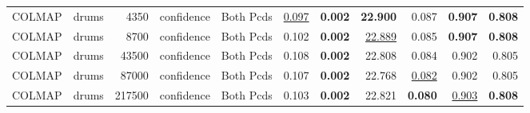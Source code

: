 \begin{table}[H]
\begin{tabular}{llrllrrrrrr}
COLMAP & drums & 4350 & confidence & Both Pcds & \underline{0.097} & \textbf{0.002} & \textbf{22.900} & 0.087 & \textbf{0.907} & \textbf{0.808} \\
COLMAP & drums & 8700 & confidence & Both Pcds & 0.102 & \textbf{0.002} & \underline{22.889} & 0.085 & \textbf{0.907} & \textbf{0.808} \\
COLMAP & drums & 43500 & confidence & Both Pcds & 0.108 & \textbf{0.002} & 22.808 & 0.084 & 0.902 & 0.805 \\
COLMAP & drums & 87000 & confidence & Both Pcds & 0.107 & \textbf{0.002} & 22.768 & \underline{0.082} & 0.902 & 0.805 \\
COLMAP & drums & 217500 & confidence & Both Pcds & 0.103 & \textbf{0.002} & 22.821 & \textbf{0.080} & \underline{0.903} & \textbf{0.808} \\
\bottomrule
\end{tabular}
\end{table}